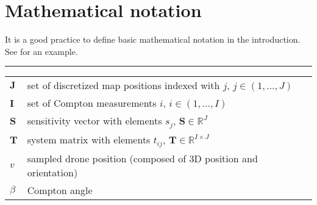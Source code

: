 \section{Mathematical notation}

It is a good practice to define basic mathematical notation in the introduction.
See  for an example.

\begin{table*}[!h]
  \scriptsize
  \centering
  \noindent\rule{\textwidth}{0.5pt}
  \begin{tabular}{lll}
    $\mathbf{J}$  & set of discretized map positions indexed with $j$, $j \in (1, \dots, J)$ \\
    $\mathbf{I}$  & set of Compton measurements $i$, $i \in (1, \dots, I)$ \\
    $\mathbf{S}$   &  sensitivity vector with elements $s_{j}$, $\mathbf{S} \in \mathbb{R}^{J}$ \\
    $\mathbf{T}$   & system matrix with elements $t_{ij}$, $\mathbf{T} \in \mathbb{R}^{I \times J}$ \\
    $v$            & sampled drone position (composed of 3D position and orientation) \\
    $\beta$       & Compton angle

\end{tabular}
\end{table*}
